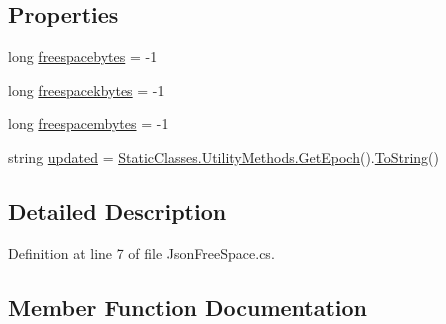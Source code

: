 \subsection*{Properties}
\begin{DoxyCompactItemize}
\item 
long \mbox{\hyperlink{class_little_weeb_library_1_1_models_1_1_json_free_space_a411fcb0402a7b696adfee7cb2a3efad0}{freespacebytes}} = -\/1
\item 
long \mbox{\hyperlink{class_little_weeb_library_1_1_models_1_1_json_free_space_a835bd50126595d47780104725423d991}{freespacekbytes}} = -\/1
\item 
long \mbox{\hyperlink{class_little_weeb_library_1_1_models_1_1_json_free_space_ac331b31dba1337829ebc86ef88164e57}{freespacembytes}} = -\/1
\item 
string \mbox{\hyperlink{class_little_weeb_library_1_1_models_1_1_json_free_space_a9c3ae588d489e377de5bd608b69a5e75}{updated}} = \mbox{\hyperlink{class_little_weeb_library_1_1_static_classes_1_1_utility_methods_a12336d9e64983ddabaad8950486fafb2}{Static\+Classes.\+Utility\+Methods.\+Get\+Epoch}}().\mbox{\hyperlink{class_little_weeb_library_1_1_models_1_1_json_free_space_ab23fb33c2e1990fc09fb171193bee852}{To\+String}}()
\end{DoxyCompactItemize}


\subsection{Detailed Description}


Definition at line 7 of file Json\+Free\+Space.\+cs.



\subsection{Member Function Documentation}
\mbox{\label{class_little_weeb_library_1_1_models_1_1_json_free_space_a3ab3c947402838a29e33684edaf16a54}} 
